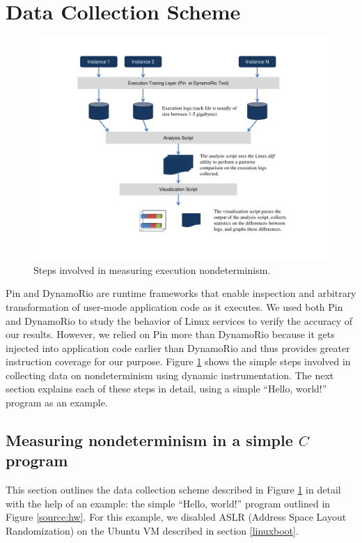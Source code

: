 \section{Data Collection Scheme} \label{datacollection}
\begin{figure}[h]
  \center
  \includegraphics[width=1.0\textwidth, trim=1cm 1cm 1cm 1cm]
                  {naivedatacollection.pdf}
  \caption[Steps involved in measuring execution nondeterminism]%
  {Steps involved in measuring execution nondeterminism.}
  \label{data:naive}
\end{figure}

Pin and DynamoRio are runtime frameworks that enable inspection
and arbitrary transformation of user-mode application code as it executes.
We used both Pin and DynamoRio to study the behavior
of Linux services to verify
the accuracy of our results. However, we relied on Pin more 
than DynamoRio because it gets injected into application code
earlier than DynamoRio and thus provides greater
instruction coverage for our purpose.  Figure \ref{data:naive} shows the simple steps involved
in collecting data on nondeterminism using
dynamic instrumentation. The next section 
explains each of these steps in detail, 
using a simple ``Hello, world!'' program as an example.

\subsection{Measuring nondeterminism in a simple $C$ program} \label{ch:hw}
This section outlines the data collection scheme
described in Figure \ref{data:naive} in detail with the help
of an example:  the simple ``Hello, world!'' program
outlined in Figure \ref{source:hw}.
For this example, we disabled ASLR (Address Space Layout
Randomization) on the Ubuntu VM described in section \ref{linuxboot}. \newline


